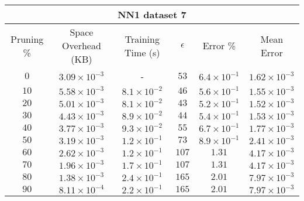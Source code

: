 \begin{adjustwidth}{0cm}{}
\begin{tabular}{cccccc}
\hline
\multicolumn{6}{c}{NN1 dataset 7} \\
\toprule
Pruning \% & Space Overhead (KB) & Training Time (s) & $\epsilon$ & Error \% & Mean Error\\
\midrule
$0$ & $3.09 \times 10^{-3}$ & - & $53$ & $6.4 \times 10^{-1}$ & $1.62 \times 10^{-3}$\\
$10$ & $5.58 \times 10^{-3}$ & $8.1 \times 10^{-2}$ & $46$ & $5.6 \times 10^{-1}$ & $1.55 \times 10^{-3}$\\
$20$ & $5.01 \times 10^{-3}$ & $8.1 \times 10^{-2}$ & $43$ & $5.2 \times 10^{-1}$ & $1.52 \times 10^{-3}$\\
$30$ & $4.43 \times 10^{-3}$ & $8.9 \times 10^{-2}$ & $44$ & $5.4 \times 10^{-1}$ & $1.53 \times 10^{-3}$\\
$40$ & $3.77 \times 10^{-3}$ & $9.3 \times 10^{-2}$ & $55$ & $6.7 \times 10^{-1}$ & $1.77 \times 10^{-3}$\\
$50$ & $3.19 \times 10^{-3}$ & $1.2 \times 10^{-1}$ & $73$ & $8.9 \times 10^{-1}$ & $2.41 \times 10^{-3}$\\
$60$ & $2.62 \times 10^{-3}$ & $1.2 \times 10^{-1}$ & $107$ & $1.31$ & $4.17 \times 10^{-3}$\\
$70$ & $1.96 \times 10^{-3}$ & $1.7 \times 10^{-1}$ & $107$ & $1.31$ & $4.17 \times 10^{-3}$\\
$80$ & $1.38 \times 10^{-3}$ & $2.4 \times 10^{-1}$ & $165$ & $2.01$ & $7.97 \times 10^{-3}$\\
$90$ & $8.11 \times 10^{-4}$ & $2.2 \times 10^{-1}$ & $165$ & $2.01$ & $7.97 \times 10^{-3}$\\
\bottomrule
\end{tabular}
\end{adjustwidth}

\par\null\par
\par\null\par

